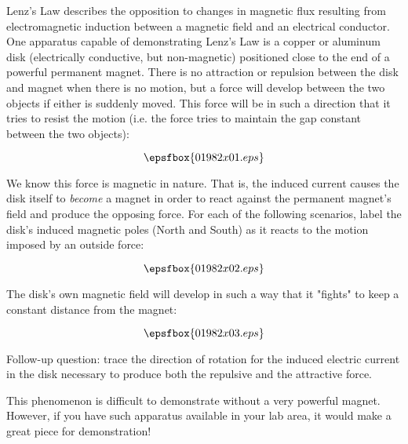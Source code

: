 

Lenz's Law describes the opposition to changes in magnetic flux resulting from electromagnetic induction between a magnetic field and an electrical conductor.  One apparatus capable of demonstrating Lenz's Law is a copper or aluminum disk (electrically conductive, but non-magnetic) positioned close to the end of a powerful permanent magnet.  There is no attraction or repulsion between the disk and magnet when there is no motion, but a force will develop between the two objects if either is suddenly moved.  This force will be in such a direction that it tries to resist the motion (i.e. the force tries to maintain the gap constant between the two objects):

$$\epsfbox{01982x01.eps}$$

We know this force is magnetic in nature.  That is, the induced current causes the disk itself to {\it become} a magnet in order to react against the permanent magnet's field and produce the opposing force.  For each of the following scenarios, label the disk's induced magnetic poles (North and South) as it reacts to the motion imposed by an outside force:

$$\epsfbox{01982x02.eps}$$







The disk's own magnetic field will develop in such a way that it "fights" to keep a constant distance from the magnet:

$$\epsfbox{01982x03.eps}$$

Follow-up question: trace the direction of rotation for the induced electric current in the disk necessary to produce both the repulsive and the attractive force.







This phenomenon is difficult to demonstrate without a very powerful magnet.  However, if you have such apparatus available in your lab area, it would make a great piece for demonstration!

\vskip 10pt

